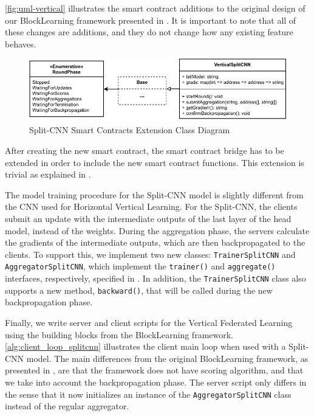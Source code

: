 \autoref{fig:uml-vertical} illustrates the smart contract additions to the original design of our BlockLearning framework presented in . It is important to note that all of these changes are additions, and they do not change how any existing feature behaves.

\begin{figure}[!ht]
    \centering
    \centering
    \includegraphics[width=1\textwidth]{graphics/smart-contract-uml-vertical.pdf}
    \caption{Split-CNN Smart Contracts Extension Class Diagram}
    \label{fig:uml-vertical}
\end{figure}

After creating the new smart contract, the smart contract bridge has to be extended in order to include the new smart contract functions. This extension is trivial as explained in .

The model training procedure for the Split-CNN model is slightly different from the CNN used for Horizontal Vertical Learning. For the Split-CNN, the clients submit an update with the intermediate outputs of the last layer of the head model, instead of the weights. During the aggregation phase, the servers calculate the gradients of the intermediate outputs, which are then backpropagated to the clients. To support this, we implement two new classes: \texttt{TrainerSplitCNN} and \texttt{AggregatorSplitCNN}, which implement the \texttt{trainer()} and \texttt{aggregate()} interfaces, respectively, specified in . In addition, the \texttt{TrainerSplitCNN} class also supports a new method, \texttt{backward()}, that will be called during the new backpropagation phase.

Finally, we write server and client scripts for the Vertical Federated Learning using the building blocks from the BlockLearning framework. \autoref{alg:client_loop_splitcnn} illustrates the client main loop when used with a Split-CNN model. The main differences from the original BlockLearning framework, as presented in , are that the framework does not have scoring algorithm, and that we take into account the backpropagation phase. The server script only differs in the sense that it now initializes an instance of the \texttt{AggregatorSplitCNN} class instead of the regular aggregator.

